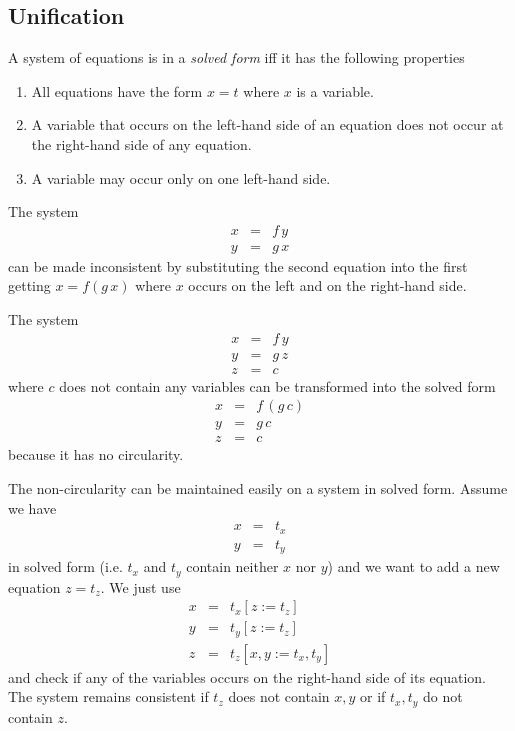 \subsection{Unification}


A system of equations is in a \emph{solved form} iff it has the following
properties
%
\begin{enumerate}

\item All equations have the form $x = t$ where $x$ is a variable.

\item A variable that occurs on the left-hand side of an equation does not
  occur at the right-hand side of any equation.

\item A variable may occur only on one left-hand side.
\end{enumerate}

The system
$$
%
\begin{array}{lll}
  x &=& f\, y
  \\
  y &=& g\, x
\end{array}
$$
%
can be made inconsistent by substituting the second equation into the first
getting $x = f (g\, x)$ where $x$ occurs on the left and on the right-hand side.

The system
$$
\begin{array}{lll}
  x &=& f\, y
  \\
  y &=& g\, z
  \\
  z &=& c
\end{array}
$$
%
where $c$ does not contain any variables can be transformed into the solved
form
$$
\begin{array}{lll}
  x &=& f\, (g \, c)
  \\
  y &=& g\, c
  \\
  z &=& c
\end{array}
$$
%
because it has no circularity.

The non-circularity can be maintained easily on a system in solved
form. Assume we have
$$
%
\begin{array}{lll}
  x &=& t_x
  \\
  y &=& t_y
\end{array}
$$
%
in solved form (i.e. $t_x$ and $t_y$ contain neither $x$ nor $y$) and we want
to add a new equation $z = t_z$. We just use
$$
%
\begin{array}{lll}
  x &=& t_x[z := t_z]
  \\
  y &=& t_y[z := t_z]
  \\
  z &=& t_z[x,y := t_x, t_y]
\end{array}
$$
%
and check if any of the variables occurs on the right-hand side of its
equation. The system remains consistent if $t_z$ does not contain $x,y$ or if
$t_x,t_y$ do not contain $z$.



